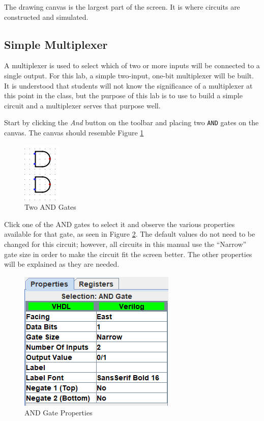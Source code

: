 The drawing canvas is the largest part of the screen. It is where circuits are constructed and simulated. 

\subsection{Simple Multiplexer}

A multiplexer is used to select which of two or more inputs will be connected to a single output. For this lab, a simple two-input, one-bit multiplexer will be built. It is understood that students will not know the significance of a multiplexer at this point in the class, but the purpose of this lab is to use \LE to build a simple circuit and a multiplexer serves that purpose well. 

Start by clicking the \textit{And} button on the toolbar and placing two \texttt{AND} gates on the canvas. The canvas should resemble Figure \ref{fig:intro-02}

\begin{figure}[H]
	\centering
	\includegraphics[width=\maxwidth{.95\linewidth}]{gfx/intro-02}
	\caption{Two AND Gates}
	\label{fig:intro-02}
\end{figure}

Click one of the AND gates to select it and observe the various properties available for that gate, as seen in Figure \ref{fig:intro-03}. The default values do not need to be changed for this circuit; however, all circuits in this manual use the ``Narrow'' gate size in order to make the circuit fit the screen better. The other properties will be explained as they are needed.

\begin{figure}[H]
	\centering
	\includegraphics[width=\maxwidth{.95\linewidth}]{gfx/intro-03}
	\caption{AND Gate Properties}
	\label{fig:intro-03}
\end{figure}

